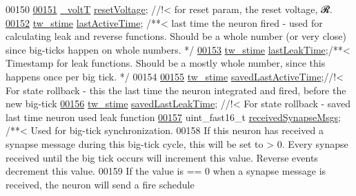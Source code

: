 \begin{DoxyCode}
00150 
\hypertarget{neuron_8h_source_l00151}{}\hyperlink{structneuron_state_af69a2c108fe9e7154fa047ea5acc5d80}{00151}     \hyperlink{assist_8h_abe1fc1b8f9efd1187e564bcb8de7f815}{\_voltT} \hyperlink{structneuron_state_af69a2c108fe9e7154fa047ea5acc5d80}{resetVoltage}; \textcolor{comment}{//!< for reset param, the reset voltage, 𝓡.}
\hypertarget{neuron_8h_source_l00152}{}\hyperlink{structneuron_state_a0658ad1f8b57a00589c6ea84f9a4ab13}{00152}     \hyperlink{structneuron_state_a0658ad1f8b57a00589c6ea84f9a4ab13}{tw\_stime} \hyperlink{structneuron_state_a0658ad1f8b57a00589c6ea84f9a4ab13}{lastActiveTime}; \textcolor{comment}{/**< last time the neuron fired - used for
       calculating leak and reverse functions. Should be a whole number (or very close) since big-ticks happen on
       whole numbers. */}
\hypertarget{neuron_8h_source_l00153}{}\hyperlink{structneuron_state_a6f4e4d8fc1cf0257b486e01f628d2656}{00153}     \hyperlink{structneuron_state_a6f4e4d8fc1cf0257b486e01f628d2656}{tw\_stime} \hyperlink{structneuron_state_a6f4e4d8fc1cf0257b486e01f628d2656}{lastLeakTime};\textcolor{comment}{/**< Timestamp for leak functions. Should be a
       mostly whole number, since this happens once per big tick. */}
00154 
\hypertarget{neuron_8h_source_l00155}{}\hyperlink{structneuron_state_a6922b3f3041346eb83cfc6352a22277b}{00155}     \hyperlink{structneuron_state_a6922b3f3041346eb83cfc6352a22277b}{tw\_stime} \hyperlink{structneuron_state_a6922b3f3041346eb83cfc6352a22277b}{savedLastActiveTime};\textcolor{comment}{//!< For state rollback - this the
       last time the neuron integrated and fired, before the new big-tick}
\hypertarget{neuron_8h_source_l00156}{}\hyperlink{structneuron_state_a50734a9ba605a083a90814b63d039a03}{00156}     \hyperlink{structneuron_state_a50734a9ba605a083a90814b63d039a03}{tw\_stime} \hyperlink{structneuron_state_a50734a9ba605a083a90814b63d039a03}{savedLastLeakTime}; \textcolor{comment}{//!< For state rollback - saved last
       time neuron used leak function}
\hypertarget{neuron_8h_source_l00157}{}\hyperlink{structneuron_state_af8935bcba177f2f3dfb9119c39ef7dc5}{00157}     uint\_fast16\_t \hyperlink{structneuron_state_af8935bcba177f2f3dfb9119c39ef7dc5}{receivedSynapseMsgs}; \textcolor{comment}{/**< Used for big-tick synchronization.
       }
00158 \textcolor{comment}{        If this neuron has received a synapse message during this big-tick cycle, this will be set to
       > 0. Every synapse received until the big tick occurs will increment this value. Reverse events decrement
       this value.}
00159 \textcolor{comment}{        If the value is == 0 when a synapse message is received, the neuron will send a fire schedule
}
\end{DoxyCode}
